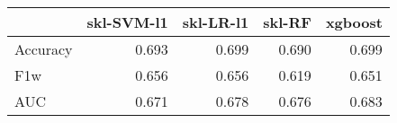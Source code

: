 \begin{tabular}{lrrrr}
\toprule
{} &  skl-SVM-l1 &  skl-LR-l1 &  skl-RF &  xgboost \\
\midrule
Accuracy &       0.693 &      0.699 &   0.690 &    0.699 \\
F1w      &       0.656 &      0.656 &   0.619 &    0.651 \\
AUC      &       0.671 &      0.678 &   0.676 &    0.683 \\
\bottomrule
\end{tabular}
